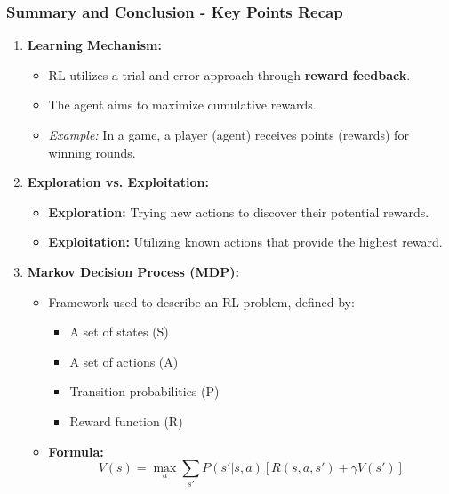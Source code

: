 \documentclass[aspectratio=169]{beamer}
\begin{document}
\begin{frame}[fragile]
    \frametitle{Summary and Conclusion - Key Points Recap}
    \begin{enumerate}
        \item \textbf{Learning Mechanism:}
            \begin{itemize}
                \item RL utilizes a trial-and-error approach through \textbf{reward feedback}.
                \item The agent aims to maximize cumulative rewards.
                \item \textit{Example:} In a game, a player (agent) receives points (rewards) for winning rounds.
            \end{itemize}
        
        \item \textbf{Exploration vs. Exploitation:}
            \begin{itemize}
                \item \textbf{Exploration:} Trying new actions to discover their potential rewards.
                \item \textbf{Exploitation:} Utilizing known actions that provide the highest reward.
            \end{itemize}
        
        \item \textbf{Markov Decision Process (MDP):}
            \begin{itemize}
                \item Framework used to describe an RL problem, defined by:
                \begin{itemize}
                    \item A set of states (S)
                    \item A set of actions (A)
                    \item Transition probabilities (P)
                    \item Reward function (R)
                \end{itemize}
                \item \textbf{Formula:}
                \begin{equation}
                    V(s) = \max_a \sum_{s'} P(s'|s, a) \left[ R(s, a, s') + \gamma V(s') \right]
                \end{equation}
            \end{itemize}
    \end{enumerate}
\end{frame}
\end{document}

